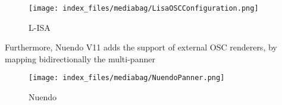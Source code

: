 \documentclass[
  letterpaper,
  DIV=11,
  numbers=noendperiod]{scrreport}
\begin{document}
\begin{figure}

{\centering \texttt{[image: index\_files/mediabag/LisaOSCConfiguration.png]}

}

\caption{L-ISA}

\end{figure}

Furthermore, Nuendo V11 adds the support of external OSC renderers, by
mapping bidirectionally the multi-panner

\begin{figure}

{\centering \texttt{[image: index\_files/mediabag/NuendoPanner.png]}

}

\caption{Nuendo}

\end{figure}
\end{document}
